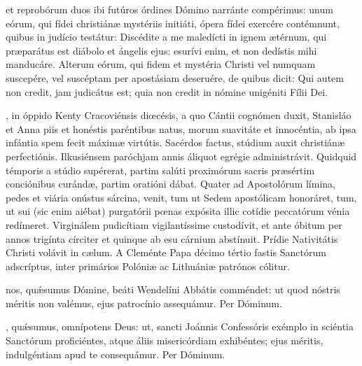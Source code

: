 \documentclass[fontsize=9pt,paper=A6,twoside,BCOR=1mm,DIV=22,headinclude]{scrarticle}
\begin{document}
\begin{multicols}{2}
\RVCvii 

{
 et reprobórum duos ibi futúros órdines Dómino narránte compérimus: unum eórum, qui fídei christiánæ mystériis initiáti, ópera fídei exercére contémnunt, quibus in judício testátur: Discédite a me maledícti in ignem ætérnum, qui præparátus est diábolo et ángelis ejus: esurívi enim, et non dedístis mihi manducáre. Alterum eórum, qui fidem et mystéria Christi vel numquam suscepére, vel suscéptam per apostásiam deseruére, de quibus dicit: Qui autem non credit, jam judicátus est; quia non credit in nómine unigéniti Fílii Dei.

\RVCviii 

}

, in óppido Kenty Cracoviénsis diœcésis, a quo Cántii cognómen duxit, Stanisláo et Anna piis et honéstis paréntibus natus, morum suavitáte et innocéntia, ab ipsa infántia spem fecit máximæ virtútis. Sacérdos factus, stúdium auxit christiánæ perfectiónis. Ilkusiénsem paróchjam annis áliquot egrégie administrávit. Quidquid témporis a stúdio supérerat, partim salúti proximórum sacris præsértim conciónibus curándæ, partim oratióni dábat. Quater ad Apostolórum límina, pedes et viária onústus sárcina, venit, tum ut Sedem apostólicam honoráret, tum, ut sui (sic enim aiébat) purgatórii pœnas expósita illic cotídie peccatórum vénia redímeret. Virginálem pudicítiam vigilantíssime custodívit, et ante óbitum per annos trigínta círciter et quinque ab esu cárnium abstínuit. Prídie Nativitátis Christi volávit in cælum. A Cleménte Papa décimo tértio fastis Sanctórum adscríptus, inter primários Polóniæ ac Lithuániæ patrónos cólitur.

\Te 


\VRCii 

\BC 


 nos, qu\'æsumus Dómine, beáti Wendelíni Abbátis comméndet: ut quod nóstris méritis non valémus, ejus patrocínio assequámur. Per Dóminum.


\AiC 

\VRCi 


, quǽsumus, omnípotens Deus: ut, sancti Joánnis Confessóris exémplo in sciéntia Sanctórum proficiéntes, atque áliis misericórdiam exhibéntes; ejus méritis, indulgéntiam apud te consequámur. Per Dóminum.


\end{multicols}
\end{document}

